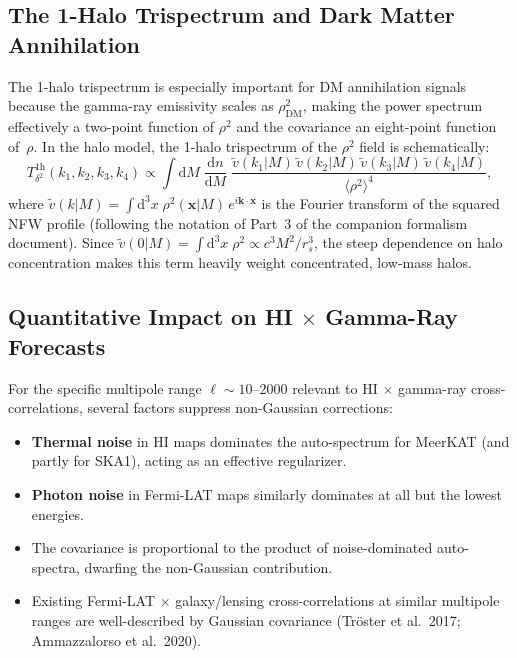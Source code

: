 \documentclass[10pt,a4paper]{article}
\newcommand{\dndm}{\frac{\mathrm{d}n}{\mathrm{d}M}}
\newcommand{\vtilde}{\tilde{v}}
\begin{document}
\subsection{The 1-Halo Trispectrum and Dark Matter Annihilation}

The 1-halo trispectrum is especially important for DM annihilation signals because the gamma-ray emissivity scales as $\rho_{\mathrm{DM}}^2$, making the power spectrum effectively a two-point function of $\rho^2$ and the covariance an eight-point function of~$\rho$. In the halo model, the 1-halo trispectrum of the $\rho^2$ field is schematically:
\begin{equation}
T^{\mathrm{1h}}_{\delta^2}(k_1, k_2, k_3, k_4) \propto \int \mathrm{d}M\; \dndm\;
\frac{\vtilde(k_1|M)\,\vtilde(k_2|M)\,\vtilde(k_3|M)\,\vtilde(k_4|M)}
{\langle\rho^2\rangle^4},
\end{equation}
where $\vtilde(k|M) = \int \mathrm{d}^3x\;\rho^2(\mathbf{x}|M)\,e^{i\mathbf{k}\cdot\mathbf{x}}$ is the Fourier transform of the squared NFW profile (following the notation of Part~3 of the companion formalism document). Since $\vtilde(0|M) = \int \mathrm{d}^3x\;\rho^2 \propto c^3 M^2 / r_s^3$, the steep dependence on halo concentration makes this term heavily weight concentrated, low-mass halos.


\subsection{Quantitative Impact on HI $\times$ Gamma-Ray Forecasts}

For the specific multipole range $\ell \sim 10$--$2000$ relevant to HI $\times$ gamma-ray cross-correlations, several factors suppress non-Gaussian corrections:
\begin{itemize}[leftmargin=2em]
\item \textbf{Thermal noise} in HI maps dominates the auto-spectrum for MeerKAT (and partly for SKA1), acting as an effective regularizer.
\item \textbf{Photon noise} in Fermi-LAT maps similarly dominates at all but the lowest energies.
\item The covariance is proportional to the product of noise-dominated auto-spectra, dwarfing the non-Gaussian contribution.
\item Existing Fermi-LAT $\times$ galaxy/lensing cross-correlations at similar multipole ranges are well-described by Gaussian covariance (Tr\"oster et al.\ 2017; Ammazzalorso et al.\ 2020).
\end{itemize}
\end{document}
